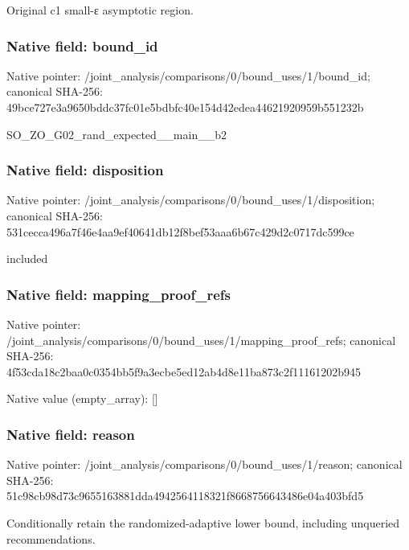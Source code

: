 \documentclass[10pt,a4paper]{article}
\begin{document}
\begingroup\raggedright\sloppy Original c1 small-{\AtlasUnicodeText ε}\allowbreak{} asymptotic region.\par\endgroup

\subsubsection{Native field: bound\_\allowbreak{}id}
Native pointer: /joint\_\allowbreak{}analysis/comparisons/0/bound\_\allowbreak{}uses/1/bound\_\allowbreak{}id; canonical SHA-256: 49bce727e3a9650bddc37fc01e5bdbfc40e154d42edea44621920959b551232b

\begingroup\raggedright\sloppy SO\_\allowbreak{}ZO\_\allowbreak{}G02\_\allowbreak{}rand\_\allowbreak{}expected\_\allowbreak{}\_\allowbreak{}main\_\allowbreak{}\_\allowbreak{}b2\par\endgroup

\subsubsection{Native field: disposition}
Native pointer: /joint\_\allowbreak{}analysis/comparisons/0/bound\_\allowbreak{}uses/1/disposition; canonical SHA-256: 531cecca496a7f46e4aa9ef40641db12f8bef53aaa6b67c429d2c0717dc599ce

\begingroup\raggedright\sloppy included\par\endgroup

\subsubsection{Native field: mapping\_\allowbreak{}proof\_\allowbreak{}refs}
Native pointer: /joint\_\allowbreak{}analysis/comparisons/0/bound\_\allowbreak{}uses/1/mapping\_\allowbreak{}proof\_\allowbreak{}refs; canonical SHA-256: 4f53cda18c2baa0c0354bb5f9a3ecbe5ed12ab4d8e11ba873c2f11161202b945

Native value (empty\_\allowbreak{}array): []

\subsubsection{Native field: reason}
Native pointer: /joint\_\allowbreak{}analysis/comparisons/0/bound\_\allowbreak{}uses/1/reason; canonical SHA-256: 51c98cb98d73c9655163881dda4942564118321f8668756643486e04a403bfd5

\begingroup\raggedright\sloppy Conditionally retain the randomized-adaptive lower bound,\allowbreak{} including unqueried recommendations.\par\endgroup
\end{document}
